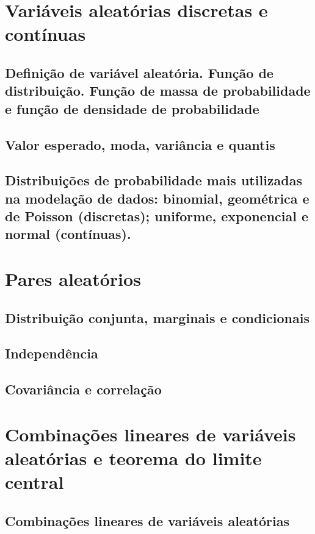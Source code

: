 \documentclass[11pt, a4paper]{article}
\begin{document}
\newpage
\section{Variáveis aleatórias discretas e contínuas}


\subsection{Definição de variável aleatória. Função de distribuição. Função de massa de probabilidade e função de densidade de probabilidade}


\subsection{Valor esperado, moda, variância e quantis}


\subsection{Distribuições de probabilidade mais utilizadas na modelação de dados: binomial, geométrica e de Poisson (discretas); uniforme, exponencial e normal (contínuas).}

\newpage
\section{Pares aleatórios}


\subsection{Distribuição conjunta, marginais e condicionais}


\subsection{Independência}


\subsection{Covariância e correlação}

\newpage
\section{Combinações lineares de variáveis aleatórias e teorema do limite central}


\subsection{Combinações lineares de variáveis aleatórias}
\end{document}
